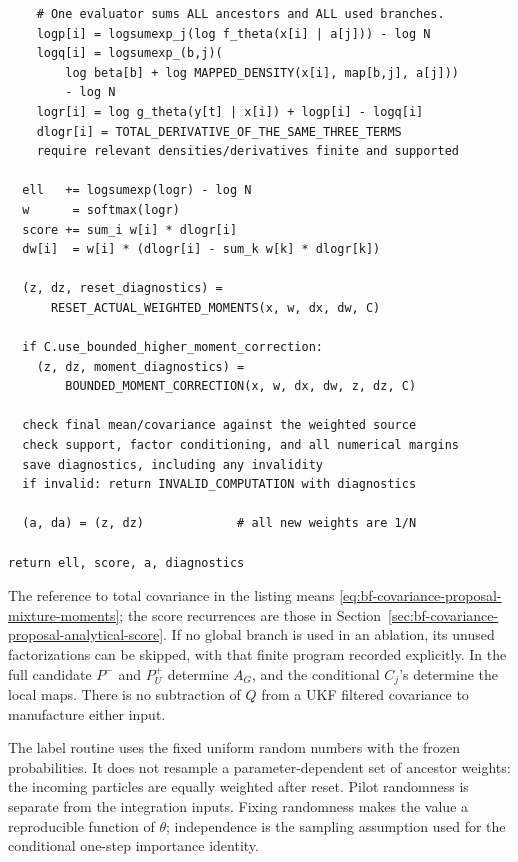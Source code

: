 \begin{lstlisting}
    # One evaluator sums ALL ancestors and ALL used branches.
    logp[i] = logsumexp_j(log f_theta(x[i] | a[j])) - log N
    logq[i] = logsumexp_(b,j)(
        log beta[b] + log MAPPED_DENSITY(x[i], map[b,j], a[j]))
        - log N
    logr[i] = log g_theta(y[t] | x[i]) + logp[i] - logq[i]
    dlogr[i] = TOTAL_DERIVATIVE_OF_THE_SAME_THREE_TERMS
    require relevant densities/derivatives finite and supported

  ell   += logsumexp(logr) - log N
  w      = softmax(logr)
  score += sum_i w[i] * dlogr[i]
  dw[i]  = w[i] * (dlogr[i] - sum_k w[k] * dlogr[k])

  (z, dz, reset_diagnostics) =
      RESET_ACTUAL_WEIGHTED_MOMENTS(x, w, dx, dw, C)

  if C.use_bounded_higher_moment_correction:
    (z, dz, moment_diagnostics) =
        BOUNDED_MOMENT_CORRECTION(x, w, dx, dw, z, dz, C)

  check final mean/covariance against the weighted source
  check support, factor conditioning, and all numerical margins
  save diagnostics, including any invalidity
  if invalid: return INVALID_COMPUTATION with diagnostics

  (a, da) = (z, dz)             # all new weights are 1/N

return ell, score, a, diagnostics
\end{lstlisting}

The reference to total covariance in the listing means
\eqref{eq:bf-covariance-proposal-mixture-moments}; the score recurrences are those in
Section~\ref{sec:bf-covariance-proposal-analytical-score}. If no global branch is used in an ablation, its unused
factorizations can be skipped, with that finite program recorded explicitly.
In the full candidate \(P^-\) and \(P_U^+\) determine \(A_G\), and the
conditional \(C_j\)'s determine the local maps. There is no subtraction
of \(Q\) from a UKF filtered covariance to manufacture either input.

The label routine uses the fixed uniform random numbers with the frozen
probabilities. It does not resample a parameter-dependent set of ancestor
weights: the incoming particles are equally weighted after reset.
Pilot randomness is separate from the integration inputs. Fixing randomness
makes the value a reproducible function of \(\theta\); independence is the
sampling assumption used for the conditional one-step importance identity.

